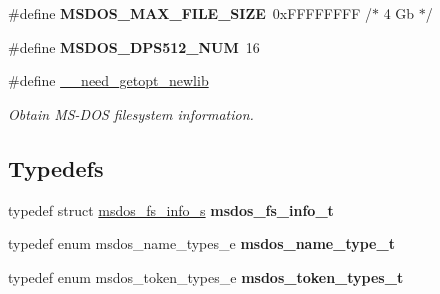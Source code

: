 \begin{DoxyCompactItemize}
\#define {\bfseries M\+S\+D\+O\+S\+\_\+\+M\+A\+X\+\_\+\+F\+I\+L\+E\+\_\+\+S\+I\+ZE}~0x\+F\+F\+F\+F\+F\+F\+F\+F /$\ast$ 4 Gb $\ast$/
\item 
\mbox{\label{group__libfs__msdos_gaaf3d2886b934112bc0e8b2f04022a767}} 
\#define {\bfseries M\+S\+D\+O\+S\+\_\+\+D\+P\+S512\+\_\+\+N\+UM}~16
\item 
\#define \mbox{\hyperlink{group__libfs__msdos_ga25647556e5128764fc5f155257e9aa64}{\+\_\+\+\_\+need\+\_\+getopt\+\_\+newlib}}
\begin{DoxyCompactList}\small\item\em Obtain M\+S-\/\+D\+OS filesystem information. \end{DoxyCompactList}\end{DoxyCompactItemize}
\subsection*{Typedefs}
\begin{DoxyCompactItemize}
\item 
\mbox{\label{group__libfs__msdos_gadc8dca0c5156055bfb252b66575b5d97}} 
typedef struct \mbox{\hyperlink{structmsdos__fs__info__s}{msdos\+\_\+fs\+\_\+info\+\_\+s}} {\bfseries msdos\+\_\+fs\+\_\+info\+\_\+t}
\item 
\mbox{\label{group__libfs__msdos_ga2d7a24bac5bd0a80d6e644f983340866}} 
typedef enum msdos\+\_\+name\+\_\+types\+\_\+e {\bfseries msdos\+\_\+name\+\_\+type\+\_\+t}
\item 
\mbox{\label{group__libfs__msdos_ga507c1c38af35ed9ca41d4558a51827ec}} 
typedef enum msdos\+\_\+token\+\_\+types\+\_\+e {\bfseries msdos\+\_\+token\+\_\+types\+\_\+t}
\end{DoxyCompactItemize}
